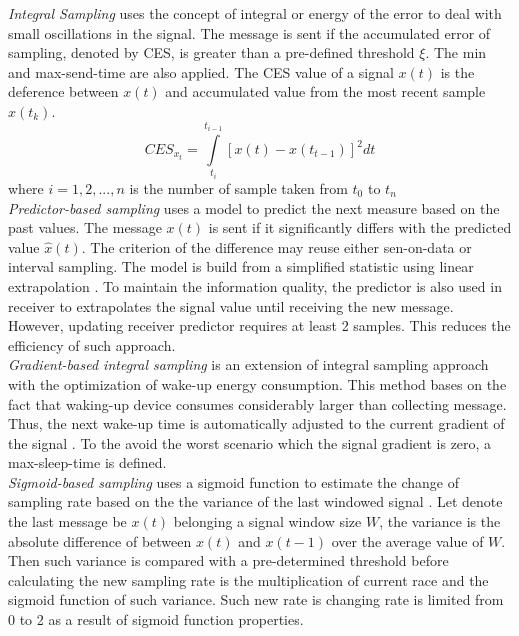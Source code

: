 \textit{Integral Sampling} uses the concept of integral or energy of the error to deal with small oscillations in the signal. The message is sent if the accumulated error of sampling, denoted by CES, is greater than a pre-defined threshold $ \xi $. The min and max-send-time are also applied. The CES value of a signal $ x(t) $ is the deference between $ x(t) $ and accumulated value from the most recent sample $ x(t_k) $. 
\begin{equation}\label{CES}
CES_{x_t} = \displaystyle\int\limits_{t_i}^{t_{i-1}} [x(t) - x(t_{t-1})]^{2}dt
\end{equation}
where $ i=1,2,...,n $ is the number of sample taken from $ t_0 $ to $ t_n $ \cite{miskowicz2005sampling}\\

\textit{Predictor-based sampling} uses a model to predict the next measure based on the past values. The message $ x(t) $ is sent if it significantly differs with  the predicted value $ \hat{x}(t) $. The criterion of the difference may reuse either sen-on-data or interval sampling. The model is build from a simplified statistic using linear extrapolation \cite{suh2007send}. To maintain the information quality, the predictor is also used in receiver to extrapolates the signal value until receiving the new message. However, updating receiver predictor requires at least 2 samples. This reduces the efficiency of such approach.\\

\textit{Gradient-based integral sampling} is an extension of integral sampling approach with the optimization of wake-up energy consumption. This method bases on the fact that waking-up device consumes considerably larger than collecting message. Thus, the next wake-up time is automatically adjusted to the current gradient of the signal \cite{ploennigs2009comparison}. To the avoid the worst scenario which the signal gradient is zero, a max-sleep-time is defined. \\

\textit{Sigmoid-based sampling} uses a sigmoid function to estimate the change of sampling rate based on the the variance of the last windowed signal \cite{shu2017energy} \cite{alippi2010adaptive}. Let denote the last message be $ x(t) $ belonging a signal window size $ W $, the variance is the absolute difference of between $ x(t) $ and $ x(t-1) $ over the average value of $ W $. Then such variance is compared with a pre-determined threshold before calculating the new sampling rate is the multiplication of current race and the sigmoid function of such variance. Such new rate is  changing rate is limited from 0 to 2 as a result of sigmoid function properties. 


